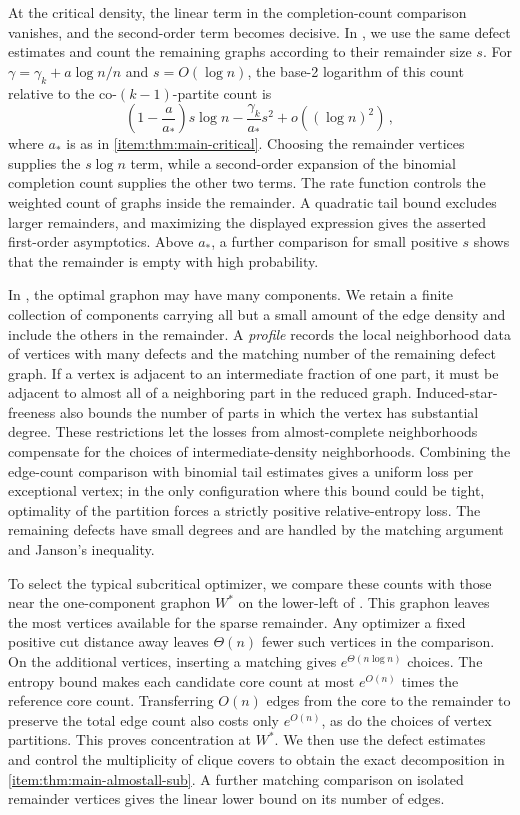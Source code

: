 At the critical density, the linear term in the completion-count comparison vanishes, and the second-order term becomes decisive. In , we use the same defect estimates and count the remaining graphs according to their remainder size $s$. For $\gamma=\gamma_k+a\log n/n$ and $s=O(\log n)$, the base-2 logarithm of this count relative to the co-$(k-1)$-partite count is
$$\left(1-\frac{a}{a_\ast}\right)s\log n-\frac{\gamma_k}{a_\ast}s^2+o((\log n)^2)\,,$$
where $a_\ast$ is as in  \ref{item:thm:main-critical}. Choosing the remainder vertices supplies the $s\log n$ term, while a second-order expansion of the binomial completion count supplies the other two terms. The rate function controls the weighted count of graphs inside the remainder. A quadratic tail bound excludes larger remainders, and maximizing the displayed expression gives the asserted first-order asymptotics. Above $a_\ast$, a further comparison for small positive $s$ shows that the remainder is empty with high probability.

In , the optimal graphon may have many components. We retain a finite collection of components carrying all but a small amount of the edge density and include the others in the remainder. A \emph{profile} records the local neighborhood data of vertices with many defects and the matching number of the remaining defect graph. If a vertex is adjacent to an intermediate fraction of one part, it must be adjacent to almost all of a neighboring part in the reduced graph. Induced-star-freeness also bounds the number of parts in which the vertex has substantial degree. These restrictions let the losses from almost-complete neighborhoods compensate for the choices of intermediate-density neighborhoods. Combining the edge-count comparison with binomial tail estimates gives a uniform loss per exceptional vertex; in the only configuration where this bound could be tight, optimality of the partition forces a strictly positive relative-entropy loss. The remaining defects have small degrees and are handled by the matching argument and Janson's inequality.

To select the typical subcritical optimizer, we compare these counts with those near the one-component graphon $W^\ast$ on the lower-left of . This graphon leaves the most vertices available for the sparse remainder. Any optimizer a fixed positive cut distance away leaves $\Theta(n)$ fewer such vertices in the comparison. On the additional vertices, inserting a matching gives $e^{\Theta(n\log n)}$ choices. The entropy bound makes each candidate core count at most $e^{O(n)}$ times the reference core count. Transferring $O(n)$ edges from the core to the remainder to preserve the total edge count also costs only $e^{O(n)}$, as do the choices of vertex partitions. This proves concentration at $W^\ast$. We then use the defect estimates and control the multiplicity of clique covers to obtain the exact decomposition in  \ref{item:thm:main-almostall-sub}. A further matching comparison on isolated remainder vertices gives the linear lower bound on its number of edges.

